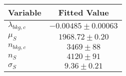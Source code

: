 \begin{tabular}[t]{lc}
\hline
Variable &Fitted Value\\
\hline\hline
$\lambda_{bkg,c}$&$-0.00485\pm0.00063$\\
\hline
$\mu_{S}$&$1968.72\pm0.20$\\
\hline
$n_{bkg,c}$&$3469\pm88$\\
\hline
$n_{S}$&$4120\pm91$\\
\hline
$\sigma_{S}$&$9.36\pm0.21$\\
\hline
\end{tabular}